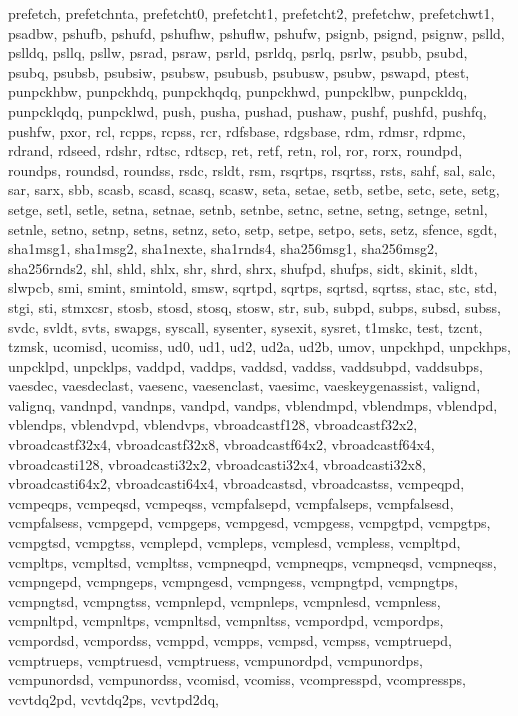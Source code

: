 {{prefetch, prefetchnta, prefetcht0, prefetcht1, prefetcht2, prefetchw,
prefetchwt1, psadbw, pshufb, pshufd, pshufhw, pshuflw, pshufw, psignb, psignd,
psignw, pslld, pslldq, psllq, psllw, psrad, psraw, psrld, psrldq, psrlq, psrlw,
psubb, psubd, psubq, psubsb, psubsiw, psubsw, psubusb, psubusw, psubw, pswapd,
ptest, punpckhbw, punpckhdq, punpckhqdq, punpckhwd, punpcklbw, punpckldq,
punpcklqdq, punpcklwd, push, pusha, pushad, pushaw, pushf, pushfd, pushfq,
pushfw, pxor, rcl, rcpps, rcpss, rcr, rdfsbase, rdgsbase, rdm, rdmsr, rdpmc,
rdrand, rdseed, rdshr, rdtsc, rdtscp, ret, retf, retn, rol, ror, rorx, roundpd,
roundps, roundsd, roundss, rsdc, rsldt, rsm, rsqrtps, rsqrtss, rsts, sahf, sal,
salc, sar, sarx, sbb, scasb, scasd, scasq, scasw, seta, setae, setb, setbe,
setc, sete, setg, setge, setl, setle, setna, setnae, setnb, setnbe, setnc,
setne, setng, setnge, setnl, setnle, setno, setnp, setns, setnz, seto, setp,
setpe, setpo, sets, setz, sfence, sgdt, sha1msg1, sha1msg2, sha1nexte,
sha1rnds4, sha256msg1, sha256msg2, sha256rnds2, shl, shld, shlx, shr, shrd,
shrx, shufpd, shufps, sidt, skinit, sldt, slwpcb, smi, smint, smintold, smsw,
sqrtpd, sqrtps, sqrtsd, sqrtss, stac, stc, std, stgi, sti, stmxcsr, stosb,
stosd, stosq, stosw, str, sub, subpd, subps, subsd, subss, svdc, svldt, svts,
swapgs, syscall, sysenter, sysexit, sysret, t1mskc, test, tzcnt, tzmsk, ucomisd,
ucomiss, ud0, ud1, ud2, ud2a, ud2b, umov, unpckhpd, unpckhps, unpcklpd,
unpcklps, vaddpd, vaddps, vaddsd, vaddss, vaddsubpd, vaddsubps, vaesdec,
vaesdeclast, vaesenc, vaesenclast, vaesimc, vaeskeygenassist, valignd, valignq,
vandnpd, vandnps, vandpd, vandps, vblendmpd, vblendmps, vblendpd, vblendps,
vblendvpd, vblendvps, vbroadcastf128, vbroadcastf32x2, vbroadcastf32x4,
vbroadcastf32x8, vbroadcastf64x2, vbroadcastf64x4, vbroadcasti128,
vbroadcasti32x2, vbroadcasti32x4, vbroadcasti32x8, vbroadcasti64x2,
vbroadcasti64x4, vbroadcastsd, vbroadcastss, vcmpeqpd, vcmpeqps, vcmpeqsd,
vcmpeqss, vcmpfalsepd, vcmpfalseps, vcmpfalsesd, vcmpfalsess, vcmpgepd,
vcmpgeps, vcmpgesd, vcmpgess, vcmpgtpd, vcmpgtps, vcmpgtsd, vcmpgtss, vcmplepd,
vcmpleps, vcmplesd, vcmpless, vcmpltpd, vcmpltps, vcmpltsd, vcmpltss, vcmpneqpd,
vcmpneqps, vcmpneqsd, vcmpneqss, vcmpngepd, vcmpngeps, vcmpngesd, vcmpngess,
vcmpngtpd, vcmpngtps, vcmpngtsd, vcmpngtss, vcmpnlepd, vcmpnleps, vcmpnlesd,
vcmpnless, vcmpnltpd, vcmpnltps, vcmpnltsd, vcmpnltss, vcmpordpd, vcmpordps,
vcmpordsd, vcmpordss, vcmppd, vcmpps, vcmpsd, vcmpss, vcmptruepd, vcmptrueps,
vcmptruesd, vcmptruess, vcmpunordpd, vcmpunordps, vcmpunordsd, vcmpunordss,
vcomisd, vcomiss, vcompresspd, vcompressps, vcvtdq2pd, vcvtdq2ps, vcvtpd2dq,
}}
